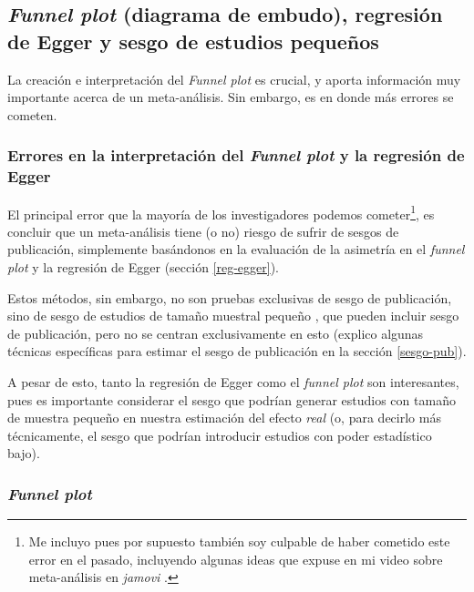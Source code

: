 \documentclass[
  bookmarksnumbered]{article}
\begin{document}
\hypertarget{funnel-inf}{%
\subsection{\texorpdfstring{\emph{Funnel plot} (diagrama de embudo), regresión de Egger y sesgo de estudios pequeños}{Funnel plot (diagrama de embudo), regresión de Egger y sesgo de estudios pequeños}}\label{funnel-inf}}

La creación e interpretación del \emph{Funnel plot} es crucial, y aporta información muy importante acerca de un meta-análisis. Sin embargo, es en donde más errores se cometen.

\hypertarget{err-funnel-egger}{%
\subsubsection{\texorpdfstring{Errores en la interpretación del \emph{Funnel plot} y la regresión de Egger}{Errores en la interpretación del Funnel plot y la regresión de Egger}}\label{err-funnel-egger}}

El principal error que la mayoría de los investigadores podemos cometer\footnote{Me incluyo pues por supuesto también soy culpable de haber cometido este error en el pasado, incluyendo algunas ideas que expuse en mi video sobre meta-análisis en \emph{jamovi} \autocite{leongomezMetaanalysis2021}.}, es concluir que un meta-análisis tiene (o no) riesgo de sufrir de sesgos de publicación, simplemente basándonos en la evaluación de la asimetría en el \emph{funnel plot} y la regresión de Egger \autocite{eggerBiasMetaanalysisDetected1997} (sección \ref{reg-egger}).

Estos métodos, sin embargo, no son pruebas exclusivas de sesgo de publicación, sino de sesgo de estudios de tamaño muestral pequeño \autocite[ver e.g.][]{schwarzerSmallStudyEffectsMetaAnalysis2015}, que pueden incluir sesgo de publicación, pero no se centran exclusivamente en esto (explico algunas técnicas específicas para estimar el sesgo de publicación en la sección \ref{sesgo-pub}).

A pesar de esto, tanto la regresión de Egger como el \emph{funnel plot} son interesantes, pues es importante considerar el sesgo que podrían generar estudios con tamaño de muestra pequeño en nuestra estimación del efecto \emph{real} (o, para decirlo más técnicamente, el sesgo que podrían introducir estudios con poder estadístico bajo).

\hypertarget{funnel-plot}{%
\subsubsection{\texorpdfstring{\emph{Funnel plot}}{Funnel plot}}\label{funnel-plot}}
\end{document}
